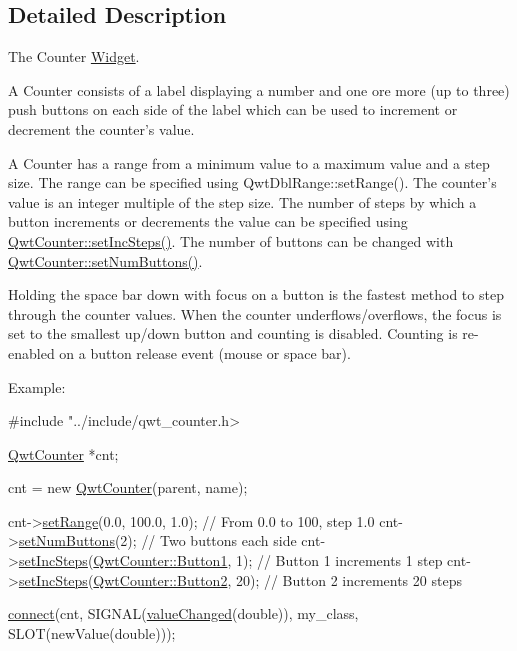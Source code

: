 \subsection{Detailed Description}
The Counter \hyperlink{class_widget}{Widget}. 

A Counter consists of a label displaying a number and one ore more (up to three) push buttons on each side of the label which can be used to increment or decrement the counter's value.

A Counter has a range from a minimum value to a maximum value and a step size. The range can be specified using Qwt\-Dbl\-Range\-::set\-Range(). The counter's value is an integer multiple of the step size. The number of steps by which a button increments or decrements the value can be specified using \hyperlink{class_qwt_counter_a6aa68e7fc717fb0e2e48a978301c96eb}{Qwt\-Counter\-::set\-Inc\-Steps()}. The number of buttons can be changed with \hyperlink{class_qwt_counter_ae9241fda2e375becdb484cc2cf7752f4}{Qwt\-Counter\-::set\-Num\-Buttons()}.

Holding the space bar down with focus on a button is the fastest method to step through the counter values. When the counter underflows/overflows, the focus is set to the smallest up/down button and counting is disabled. Counting is re-\/enabled on a button release event (mouse or space bar).

Example\-: 
\begin{DoxyCode}
\textcolor{preprocessor}{#include "../include/qwt\_counter.h>}

\hyperlink{class_qwt_counter}{QwtCounter} *cnt;

cnt = \textcolor{keyword}{new} \hyperlink{class_qwt_counter_aee94cdbaf1f3d22e110fd3535dbca34a}{QwtCounter}(parent, name);

cnt->\hyperlink{class_qwt_double_range_a43891011664b74b8e5454763a3f5ff21}{setRange}(0.0, 100.0, 1.0);             \textcolor{comment}{// From 0.0 to 100, step 1.0}
cnt->\hyperlink{class_qwt_counter_ae9241fda2e375becdb484cc2cf7752f4}{setNumButtons}(2);                      \textcolor{comment}{// Two buttons each side}
cnt->\hyperlink{class_qwt_counter_a6aa68e7fc717fb0e2e48a978301c96eb}{setIncSteps}(\hyperlink{class_qwt_counter_a027cfd91946ca9a19a1d606411e0f374a1b29fe43c7d59986eb5854ddaf6f7179}{QwtCounter::Button1}, 1);   \textcolor{comment}{// Button 1 increments 1 step}
cnt->\hyperlink{class_qwt_counter_a6aa68e7fc717fb0e2e48a978301c96eb}{setIncSteps}(\hyperlink{class_qwt_counter_a027cfd91946ca9a19a1d606411e0f374a6015e556fcb8c4d45126dee5435b478d}{QwtCounter::Button2}, 20);  \textcolor{comment}{// Button 2 increments 20 steps}

\hyperlink{namespace_qxt_meta_object_a0672fb5917d321762dfd192f229469d5}{connect}(cnt, SIGNAL(\hyperlink{class_qwt_counter_add02928c348417fbfadd7095d058f331}{valueChanged}(\textcolor{keywordtype}{double})), my\_class, SLOT(newValue(\textcolor{keywordtype}{double})));
\end{DoxyCode}
 

